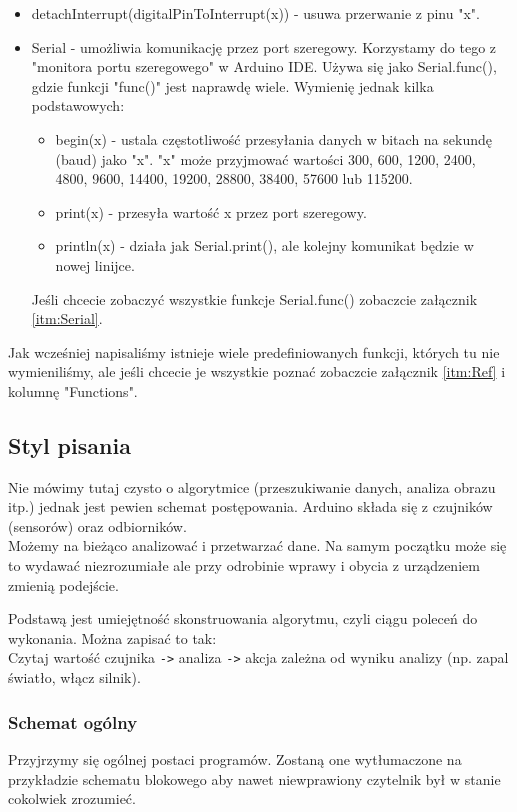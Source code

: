 \documentclass[a4paper,12pt, twoside]{article}
\begin{document}
\begin{itemize}
		\item detachInterrupt(digitalPinToInterrupt(x)) - usuwa przerwanie z pinu "x".
		\item Serial - umożliwia komunikację przez port szeregowy. Korzystamy do tego z "monitora portu szeregowego" w Arduino IDE. Używa się jako Serial.func(), gdzie funkcji "func()" jest naprawdę wiele. Wymienię jednak kilka podstawowych:
			\begin{itemize}
				\item begin(x) - ustala częstotliwość przesyłania danych w bitach na sekundę (baud) jako "x". "x" może przyjmować wartości 300, 600, 1200, 2400, 4800, 9600, 14400, 19200, 28800, 38400, 57600 lub 115200.
				\item print(x) - przesyła wartość x przez port szeregowy.
				\item println(x) - działa jak Serial.print(), ale kolejny komunikat będzie w nowej linijce.
			\end{itemize}
			Jeśli chcecie zobaczyć wszystkie funkcje Serial.func() zobaczcie załącznik \ref{itm:Serial}.
	\end{itemize}
	Jak wcześniej napisaliśmy istnieje wiele predefiniowanych funkcji, których tu nie wymieniliśmy, ale jeśli chcecie je wszystkie poznać zobaczcie załącznik \ref{itm:Ref} i kolumnę "Functions".


	\subsection {Styl pisania}
	Nie mówimy tutaj czysto o algorytmice (przeszukiwanie danych, analiza obrazu itp.) jednak jest pewien schemat postępowania. Arduino składa się z czujników (sensorów) oraz odbiorników. %
	\\
	Możemy  na bieżąco analizować i przetwarzać dane. Na samym początku może się to wydawać niezrozumiałe ale przy odrobinie wprawy i obycia z urządzeniem zmienią podejście.
		
	Podstawą jest umiejętność skonstruowania algorytmu, czyli ciągu poleceń do wykonania. Można zapisać to tak:
	\\Czytaj wartość czujnika \verb|->| analiza \verb|->| akcja zależna od wyniku analizy (np. zapal światło, włącz silnik).
\subsubsection{Schemat ogólny}
	Przyjrzymy się ogólnej postaci programów. Zostaną one wytłumaczone na przykładzie schematu blokowego aby nawet niewprawiony czytelnik był w stanie cokolwiek zrozumieć.
\end{document}

